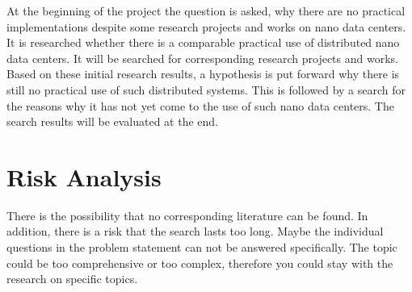 \documentclass[sigchi-a, authorversion]{acmart}
\begin{document}
At the beginning of the project the question is asked, why there are no practical implementations despite some research projects and works on nano data centers.
It is researched whether there is a comparable practical use of distributed nano data centers. It will be searched for corresponding research projects and works. Based on these initial research results, a hypothesis is put forward why there is still no practical use of such distributed systems. This is followed by a search for the reasons why it has not yet come to the use of such nano data centers. The search results will be evaluated at the end.

\section{Risk Analysis} %
There is the possibility that no corresponding literature can be found. In addition, there is a risk that the search lasts too long. Maybe the individual questions in the problem statement can not be answered specifically. The topic could be too comprehensive or too complex, therefore you could stay with the research on specific topics.



\end{document}
